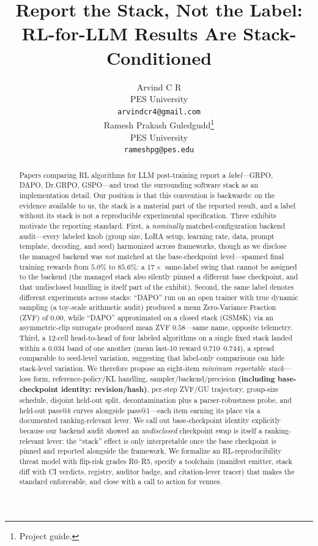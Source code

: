 \documentclass{article}  \usepackage[preprint,nonatbib]{neurips_2026} \usepackage[numbers]{natbib}
\title{Report the Stack, Not the Label:\\
       RL-for-LLM Results Are Stack-Conditioned}
\author{
  Arvind C R \\
  PES University\\
  \texttt{arvindcr4@gmail.com} \\
  \And
  Ramesh Prakash Guledgudd\thanks{Project guide.} \\
  PES University\\
  \texttt{rameshpg@pes.edu} \\
}
\begin{document}
\sloppy {}  \hfuzz=2pt
\maketitle
\begin{abstract}
Papers comparing RL algorithms for LLM post-training report a \emph{label}---GRPO,
DAPO, Dr.GRPO, GSPO---and treat the surrounding software stack as an
implementation detail. Our position is that this convention is backwards: on the
evidence available to us, the stack is a material part of the reported result,
and a label without its stack is not a reproducible experimental
specification. Three exhibits motivate the reporting standard. First, a \emph{nominally} matched-configuration backend
audit---every labeled knob (group size, LoRA setup, learning rate, data, prompt
template, decoding, and seed) harmonized across frameworks, though as we disclose
the managed backend was \emph{not} matched at the base-checkpoint level---spanned
final training rewards from $5.0\%$ to $85.6\%$: a $17\times$ same-label swing
that cannot be assigned to the backend (the managed stack
also silently pinned a different base checkpoint, and that undisclosed bundling
is itself part of the exhibit). Second, the same label denotes different
experiments across stacks: ``DAPO'' run on an open trainer with true dynamic
sampling (a toy-scale arithmetic audit) produced a mean Zero-Variance Fraction
(ZVF) of $0.00$, while ``DAPO'' approximated on a closed stack (GSM8K) via an
asymmetric-clip surrogate produced mean ZVF $0.58$---same name, opposite
telemetry. Third, a 12-cell head-to-head of four labeled algorithms on a single
fixed stack landed within a $0.034$ band of one another (mean last-10 reward
$0.710$--$0.744$), a spread comparable to seed-level variation, suggesting
that label-only comparisons can hide stack-level variation. We therefore
propose an eight-item \emph{minimum reportable
stack}---loss form, reference-policy/KL handling, sampler/backend/precision
\textbf{(including base-checkpoint identity: revision/hash)}, per-step ZVF/GU
trajectory, group-size schedule, disjoint held-out split,
decontamination plus a parser-robustness probe, and held-out pass@$k$
curves alongside pass@1---each item earning its place via a
documented ranking-relevant lever. We call out base-checkpoint identity explicitly
because our backend audit showed an \emph{undisclosed} checkpoint swap is itself a
ranking-relevant lever: the ``stack'' effect is only interpretable once the base
checkpoint is pinned and reported alongside the framework. We formalize an RL-reproducibility threat
model with flip-risk grades R0--R5, specify a toolchain (manifest emitter, stack
diff with CI verdicts, registry, auditor badge, and citation-lever tracer) that
makes the standard enforceable, and close with a call to action for venues.
\end{abstract}
\end{document}
